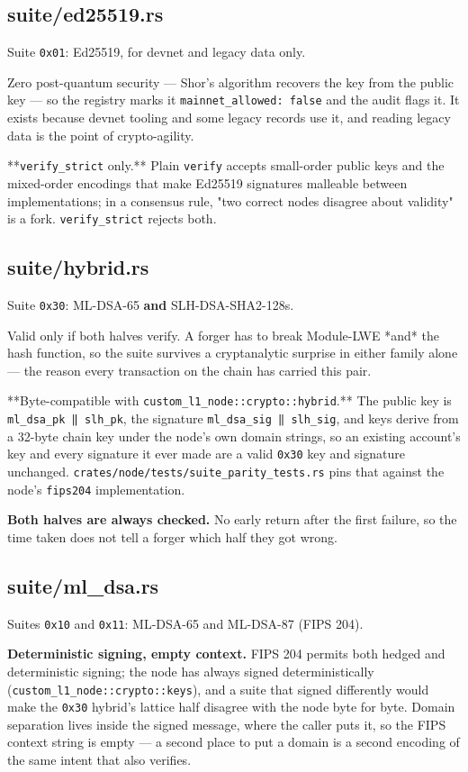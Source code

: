 \documentclass[11pt,a4paper]{article}
\begin{document}
\subsection{suite/ed25519.rs}
Suite \texttt{0x01}: Ed25519, for devnet and legacy data only.

Zero post-quantum security — Shor's algorithm recovers the key from the
public key — so the registry marks it \texttt{mainnet\_allowed: false} and the
audit flags it. It exists because devnet tooling and some legacy records
use it, and reading legacy data is the point of crypto-agility.

**\texttt{verify\_strict} only.** Plain \texttt{verify} accepts small-order public keys
and the mixed-order encodings that make Ed25519 signatures malleable
between implementations; in a consensus rule, "two correct nodes disagree
about validity" is a fork. \texttt{verify\_strict} rejects both.

\subsection{suite/hybrid.rs}
Suite \texttt{0x30}: ML-DSA-65 \textbf{and} SLH-DSA-SHA2-128s.

Valid only if both halves verify. A forger has to break Module-LWE *and*
the hash function, so the suite survives a cryptanalytic surprise in either
family alone — the reason every transaction on the chain has carried this
pair.

**Byte-compatible with \texttt{custom\_l1\_node::crypto::hybrid}.** The public key
is \texttt{ml\_dsa\_pk ‖ slh\_pk}, the signature \texttt{ml\_dsa\_sig ‖ slh\_sig}, and keys
derive from a 32-byte chain key under the node's own domain strings, so an
existing account's key and every signature it ever made are a valid \texttt{0x30}
key and signature unchanged. \texttt{crates/node/tests/suite\_parity\_tests.rs} pins
that against the node's \texttt{fips204} implementation.

\textbf{Both halves are always checked.} No early return after the first
failure, so the time taken does not tell a forger which half they got
wrong.

\subsection{suite/ml\_dsa.rs}
Suites \texttt{0x10} and \texttt{0x11}: ML-DSA-65 and ML-DSA-87 (FIPS 204).

\textbf{Deterministic signing, empty context.} FIPS 204 permits both hedged and
deterministic signing; the node has always signed deterministically
(\texttt{custom\_l1\_node::crypto::keys}), and a suite that signed differently would
make the \texttt{0x30} hybrid's lattice half disagree with the node byte for byte.
Domain separation lives inside the signed message, where the caller puts
it, so the FIPS context string is empty — a second place to put a domain is
a second encoding of the same intent that also verifies.
\end{document}
